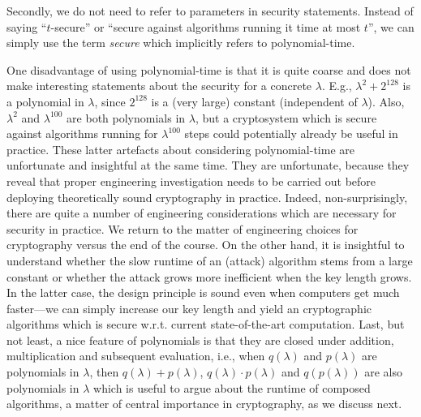 Secondly, we do not need to refer to parameters in security statements. Instead of saying ``$t$-secure'' or ``secure against algorithms running it time at most $t$'', we can simply use the term \emph{secure} which implicitly refers to polynomial-time.

One disadvantage of using polynomial-time is that it is quite coarse and does not make interesting statements about the security for a concrete $\lambda$. E.g., $\lambda^2+2^{128}$ is a polynomial in $\lambda$, since $2^{128}$ is a (very large) constant (independent of $\lambda$). Also, $\lambda^2$ and $\lambda^{100}$ are both polynomials in $\lambda$, but a cryptosystem which is secure against algorithms running for $\lambda^{100}$ steps could potentially already be useful in practice. These latter artefacts about considering polynomial-time are unfortunate and insightful at the same time. They are unfortunate, because they reveal that proper engineering investigation needs to be carried out before deploying theoretically sound cryptography in practice. Indeed, non-surprisingly, there are quite a number of engineering considerations which are necessary for security in practice. We return to the matter of engineering choices for cryptography versus the end of the course.
 On the other hand, it is insightful to understand whether the slow runtime of an (attack) algorithm stems from a large constant or whether the attack grows more inefficient when the key length grows. In the latter case, the design principle is sound even when computers get much faster---we can simply increase our key length and yield an cryptographic algorithms which is secure w.r.t. current state-of-the-art computation. Last, but not least, a nice feature of polynomials is that they are closed under addition, multiplication and subsequent evaluation, i.e., when $q(\lambda)$ and $p(\lambda)$ are polynomials in $\lambda$, then $q(\lambda)+p(\lambda)$, $q(\lambda)\cdot p(\lambda)$ and $q(p(\lambda))$ are also polynomials in $\lambda$ which is useful to argue about the runtime of composed algorithms, a matter of central importance in cryptography, as we discuss next.

